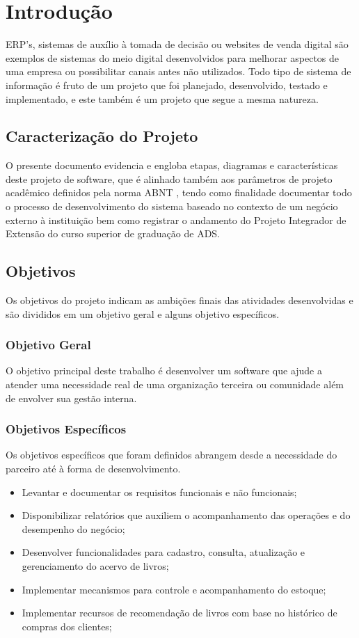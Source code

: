 \chapter{Introdução}

ERP’s, sistemas de auxílio à tomada de decisão ou websites de venda digital são exemplos de sistemas do meio digital desenvolvidos para melhorar aspectos de uma empresa ou possibilitar canais antes não utilizados. Todo tipo de sistema de informação é fruto de um projeto que foi planejado, desenvolvido, testado e implementado, e este também é um projeto que segue a mesma natureza.

\section{Caracterização do Projeto}
O presente documento evidencia e engloba etapas, diagramas e características deste projeto de software, que é alinhado também aos parâmetros de projeto acadêmico definidos pela norma ABNT \cite{de2011associaccao}, tendo como finalidade documentar todo o processo de desenvolvimento do sistema baseado no contexto de um negócio externo à instituição bem como registrar o andamento do Projeto Integrador de Extensão do curso superior de graduação de ADS.

\section{Objetivos}
Os objetivos do projeto indicam as ambições finais das atividades desenvolvidas e são divididos em um objetivo geral e alguns objetivo específicos.

\subsection{Objetivo Geral}
O objetivo principal deste trabalho é desenvolver um software que ajude a atender uma necessidade real de uma organização terceira ou comunidade além de envolver sua gestão interna.

\subsection{Objetivos Específicos}
Os objetivos específicos que foram definidos abrangem desde a necessidade do parceiro até à forma de desenvolvimento.
\begin{itemize}
  \item Levantar e documentar os requisitos funcionais e não funcionais;
  \item Disponibilizar relatórios que auxiliem o acompanhamento das operações e do desempenho do negócio;
  \item Desenvolver funcionalidades para cadastro, consulta, atualização e gerenciamento do acervo de livros;
  \item Implementar mecanismos para controle e acompanhamento do estoque;
  \item Implementar recursos de recomendação de livros com base no histórico de compras dos clientes;
\end{itemize}

